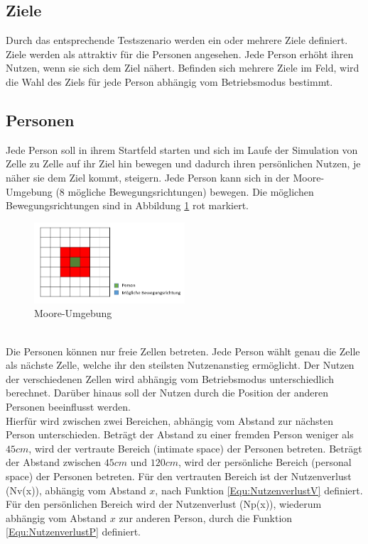 \subsection{Ziele}
Durch das entsprechende Testszenario werden ein oder mehrere Ziele definiert. Ziele werden als attraktiv für die Personen angesehen. Jede Person erhöht ihren Nutzen, wenn sie sich dem Ziel nähert. Befinden sich mehrere Ziele im Feld, wird die Wahl des Ziels für jede Person abhängig vom Betriebsmodus bestimmt. 

\subsection{Personen}
Jede Person soll in ihrem Startfeld starten und sich im Laufe der Simulation von Zelle zu Zelle auf ihr Ziel hin bewegen und dadurch ihren persönlichen Nutzen, je näher sie dem Ziel kommt, steigern. Jede Person kann sich in der Moore-Umgebung (8 mögliche Bewegungsrichtungen) bewegen. Die möglichen Bewegungsrichtungen sind in Abbildung \ref{fig:MooreUmgebung} rot markiert.
\begin{figure}[htpb]
	\centering
	\includegraphics[width=0.5\textwidth]{abbildungen/MooreUmgebung.png}
	\caption{Moore-Umgebung}
	\label{fig:MooreUmgebung}
\end{figure}
\\
Die Personen können nur freie Zellen betreten. Jede Person wählt genau die Zelle als nächste Zelle, welche ihr den steilsten Nutzenanstieg ermöglicht. Der Nutzen der verschiedenen Zellen wird abhängig vom Betriebsmodus unterschiedlich berechnet. Darüber hinaus soll der Nutzen durch die Position der anderen Personen beeinflusst werden. \\

Hierfür wird zwischen zwei Bereichen, abhängig vom Abstand zur nächsten Person unterschieden. Beträgt der Abstand zu einer fremden Person weniger als $45cm$, wird der vertraute Bereich (intimate space) der Personen betreten. Beträgt der Abstand zwischen $45cm$ und $120cm$, wird der persönliche Bereich (personal space) der Personen betreten. Für den vertrauten Bereich ist der Nutzenverlust (Nv(x)), abhängig vom Abstand $x$, nach Funktion \ref{Equ:NutzenverlustV} definiert. Für den persönlichen Bereich wird der Nutzenverlust (Np(x)), wiederum abhängig vom Abstand $x$ zur anderen Person, durch die Funktion \ref{Equ:NutzenverlustP} definiert. 

